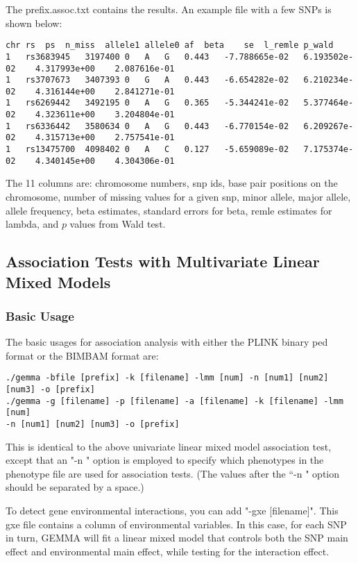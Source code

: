 \documentclass[11pt]{article}
\begin{document}
The prefix.assoc.txt contains the results. An example file with a few
SNPs is shown below:
%
\begin{verbatim}
chr	rs	ps	n_miss	allele1	allele0	af	beta	se	l_remle	p_wald
1	rs3683945	3197400	0	A	G	0.443	-7.788665e-02	6.193502e-02	4.317993e+00	2.087616e-01
1	rs3707673	3407393	0	G	A	0.443	-6.654282e-02	6.210234e-02	4.316144e+00	2.841271e-01
1	rs6269442	3492195	0	A	G	0.365	-5.344241e-02	5.377464e-02	4.323611e+00	3.204804e-01
1	rs6336442	3580634	0	A	G	0.443	-6.770154e-02	6.209267e-02	4.315713e+00	2.757541e-01
1	rs13475700	4098402	0	A	C	0.127	-5.659089e-02	7.175374e-02	4.340145e+00	4.304306e-01
\end{verbatim}
%
The 11 columns are: chromosome numbers, snp ids, base pair positions
on the chromosome, number of missing values for a given snp, minor
allele, major allele, allele frequency, beta estimates, standard
errors for beta, remle estimates for lambda, and $p$ values from Wald
test.

\subsection{Association Tests with Multivariate Linear Mixed Models}

\subsubsection{Basic Usage}

The basic usages for association analysis with either the PLINK binary
ped format or the BIMBAM format are:

\begin{verbatim}
./gemma -bfile [prefix] -k [filename] -lmm [num] -n [num1] [num2] [num3] -o [prefix]
./gemma -g [filename] -p [filename] -a [filename] -k [filename] -lmm [num]
-n [num1] [num2] [num3] -o [prefix]
\end{verbatim}

This is identical to the above univariate linear mixed model
association test, except that an "-n " option is employed to specify
which phenotypes in the phenotype file are used for association tests.
(The values after the ``-n " option should be separated by a space.)

To detect gene environmental interactions, you can add "-gxe
[filename]". This gxe file contains a column of environmental
variables. In this case, for each SNP in turn, GEMMA will fit a linear
mixed model that controls both the SNP main effect and environmental
main effect, while testing for the interaction effect.
\end{document}
